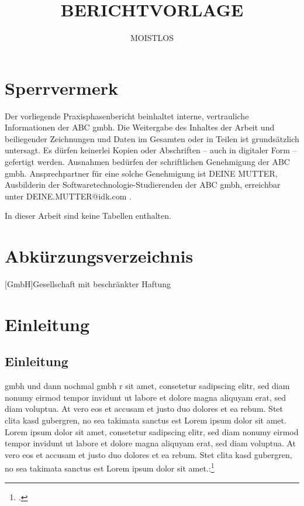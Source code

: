 \documentclass[12pt, oneside]{article}  		%
\title{BERICHTVORLAGE}
\author{MOISTLOS}
\begin{document}
\begin{spacing}{1.5}



\newpage
\thispagestyle{empty}
\section*{Sperrvermerk}
Der vorliegende Praxisphasenbericht beinhaltet interne, vertrauliche Informationen der ABC \ac{gmbh}.
Die Weitergabe des Inhaltes der Arbeit und beiliegender Zeichnungen und Daten im Gesamten oder in Teilen ist grundsätzlich untersagt. Es dürfen keinerlei Kopien oder Abschriften – auch in digitaler Form – gefertigt werden. Ausnahmen bedürfen der schriftlichen Genehmigung der ABC \ac{gmbh}. Ansprechpartner für eine solche Genehmigung ist DEINE MUTTER, Ausbilderin der Softwaretechnologie-Studierenden der ABC \ac{gmbh}, erreichbar unter DEINE.MUTTER@idk.com . 

\newpage
\thispagestyle{empty}
\renewcommand{\contentsname}{Inhaltsverzeichnis}
\tableofcontents{}

\newpage
\thispagestyle{empty}
\renewcommand{\listfigurename}{Abbildungsverzeichnis}
\listoffigures


\newpage
\listoftables
In dieser Arbeit sind keine Tabellen enthalten. 
\thispagestyle{empty}
\newpage
\thispagestyle{empty}
\section*{Abkürzungsverzeichnis}
\begin{acronym}[EuGH]
	[GmbH]{Gesellschaft mit beschränkter Haftung}
	

\end{acronym}
\newpage
\clearpage
\setcounter{page}{1}
\section{Einleitung}
\subsection{Einleitung}


\ac{gmbh} und dann nochmal \ac{gmbh} r sit amet, consetetur sadipscing elitr, sed diam nonumy eirmod tempor invidunt ut labore et dolore magna aliquyam erat, sed diam voluptua. At vero eos et accusam et justo duo dolores et ea rebum. Stet clita kasd gubergren, no sea takimata sanctus est Lorem ipsum dolor sit amet. Lorem ipsum dolor sit amet, consetetur sadipscing elitr, sed diam nonumy eirmod tempor invidunt ut labore et dolore magna aliquyam erat, sed diam voluptua. At vero eos et accusam et justo duo dolores et ea rebum. Stet clita kasd gubergren, no sea takimata sanctus est Lorem ipsum dolor sit amet.:\footcite[vgl. ][]{test1234}



\end{spacing}
\end{document}
